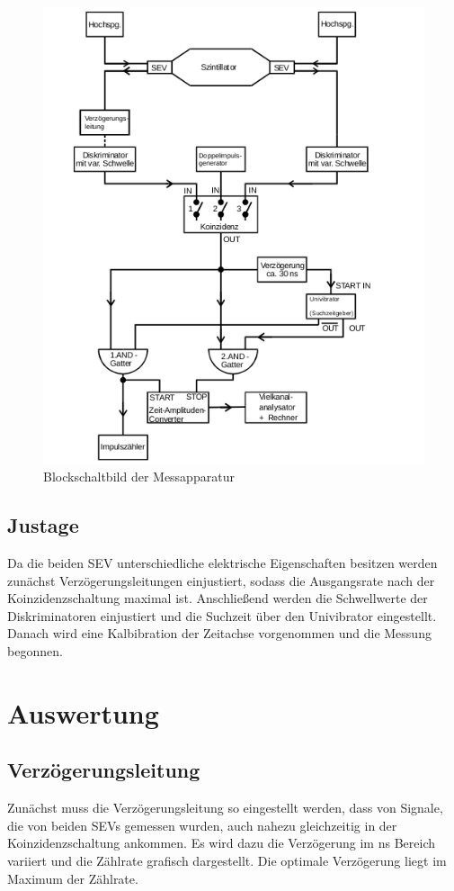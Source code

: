 \begin{figure}[H]
	\centering
	\includegraphics[width=0.8\linewidth,height=0.8\textheight,keepaspectratio]{Bilder/block.png}
	\caption{Blockschaltbild der Messapparatur \cite{Anl}}
	\label{FIG:Aufbau}
\end{figure}

\subsection{Justage}
Da die beiden SEV unterschiedliche elektrische Eigenschaften besitzen werden zunächst Verzögerungsleitungen einjustiert, sodass die Ausgangsrate nach der Koinzidenzschaltung maximal ist. Anschließend werden die Schwellwerte der Diskriminatoren einjustiert und die Suchzeit über den Univibrator eingestellt. Danach wird eine Kalbibration der Zeitachse vorgenommen und die Messung begonnen.

\section{Auswertung}

\subsection{Verzögerungsleitung}
Zunächst muss die Verzögerungsleitung so eingestellt werden, dass von Signale, die von beiden SEVs gemessen wurden, auch nahezu gleichzeitig in der Koinzidenzschaltung ankommen. Es wird dazu die Verzögerung im ns Bereich variiert und die Zählrate grafisch dargestellt. Die optimale Verzögerung liegt im Maximum der Zählrate.

